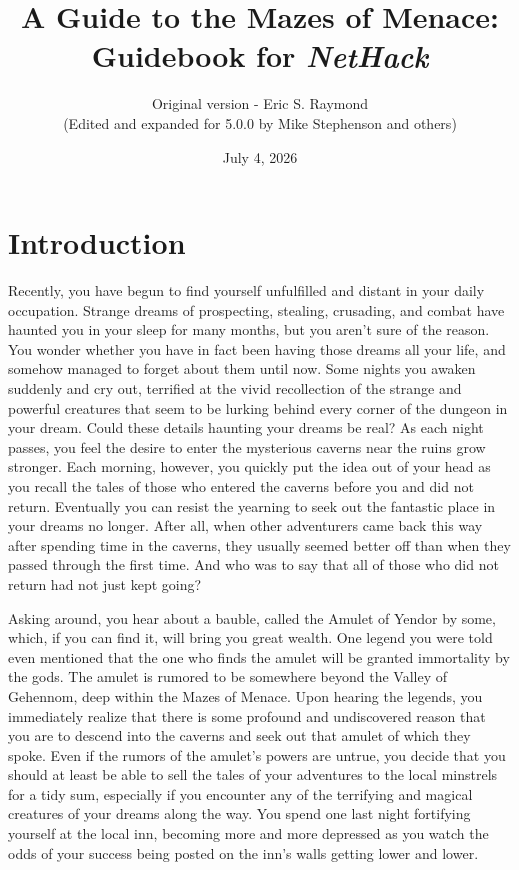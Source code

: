 \documentclass[titlepage]{article}
\begin{document}
%
%

\title{\LARGE A Guide to the Mazes of Menace:\\
\Large Guidebook for \textit{NetHack}}

\author{Original version - Eric S. Raymond\\
(Edited and expanded for 5.0.0 by Mike Stephenson and others)}
\date{July 4, 2026}

\maketitle

\section{Introduction}


Recently, you have begun to find yourself unfulfilled and distant
in your daily occupation.  Strange dreams of prospecting, stealing,
crusading, and combat have haunted you in your sleep for many months,
but you aren't sure of the reason.  You wonder whether you have in
fact been having those dreams all your life, and somehow managed to
forget about them until now.  Some nights you awaken suddenly
and cry out, terrified at the vivid recollection of the strange and
powerful creatures that seem to be lurking behind every corner of the
dungeon in your dream.  Could these details haunting your dreams be real?
As each night passes, you feel the desire to enter the mysterious caverns
near the ruins grow stronger.  Each morning, however, you quickly put
the idea out of your head as you recall the tales of those who entered
the caverns before you and did not return.  Eventually you can resist
the yearning to seek out the fantastic place in your dreams no longer.
After all, when other adventurers came back this way after spending time
in the caverns, they usually seemed better off than when they passed
through the first time.  And who was to say that all of those who did
not return had not just kept going?

Asking around, you hear about a bauble, called the Amulet of Yendor by some,
which, if you can find it, will bring you great wealth.  One legend you were
told even mentioned that the one who finds the amulet will be granted
immortality by the gods.  The amulet is rumored to be somewhere beyond the
Valley of Gehennom, deep within the Mazes of Menace.  Upon hearing the
legends, you immediately realize that there is some profound and
undiscovered reason that you are to descend into the caverns and seek
out that amulet of which they spoke.  Even if the rumors of the amulet's
powers are untrue, you decide that you should at least be able to sell the
tales of your adventures to the local minstrels for a tidy sum, especially
if you encounter any of the terrifying and magical creatures of
your dreams along the way.  You spend one last night fortifying yourself
at the local inn, becoming more and more depressed as you watch the odds
of your success being posted on the inn's walls getting lower and lower.
\end{document}
